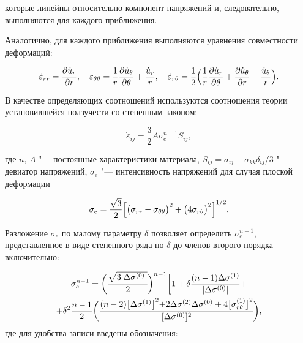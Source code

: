 которые линейны относительно компонент напряжений и, следовательно, выполняются для каждого приближения.



Аналогично, для каждого приближения выполняются уравнения совместности деформаций:

\begin{equation}

\label{mos:eq7}

\dot{\varepsilon}_{rr}=\frac{\partial \dot{u}_{r}}{\partial r} ,

\quad 

\dot{\varepsilon}_{\theta \theta}=\frac{1}{r}\frac{\partial \dot{u}_{\theta}}{\partial \theta}+\frac{\dot{u}_{r}}{r} ,

\quad

\dot{\varepsilon}_{r \theta}=\frac{1}{2}\Bigl(\frac{1}{r}\frac{\partial \dot{u}_{r}}{\partial \theta}+\frac{\partial \dot{u}_{\theta}}{\partial r}-\frac{\dot{u}_{\theta}}{r}\Bigr).

\end{equation}



В качестве определяющих соотношений используются соотношения теории установившейся ползучести со степенным законом:

\begin{equation}

\label{mos:eq8}

\dot{\varepsilon}_{ij}=\frac{3}{2}A\sigma_e^{n-1}S_{ij},

\end{equation}

где $n$, $A$ "--- постоянные характеристики материала, $S_{ij}=\sigma_{ij}- \sigma_{kk}\delta_{ij}/3$ "--- девиатор напряжений, $\sigma_e$ "--- интенсивность напряжений для случая плоской деформации

$$\sigma_e=\frac{\sqrt{3}}{2}\Bigl[\bigl(\sigma_{rr}-\sigma_{\theta\theta}\bigr)^2

+\bigl(4\sigma_{r\theta}\bigr)^2\Bigl]^{{1}/{2}}.$$

Разложение $\sigma_e$ по малому параметру $\delta$ позволяет определить  $\sigma_e^{n-1}$, представленное в виде степенного ряда по $\delta$ до членов второго порядка включительно:

\begin{multline}

\label{mos:eq9}

\sigma_e^{n-1}=\biggl{(}\cfrac{\sqrt{3|\Delta\sigma^{(0)}|}}{2}\biggl{)}^{n-1}

\biggl[1+\delta\frac{(n-1)\Delta\sigma^{(1)}}{|\Delta\sigma^{(0)}|}+\\

+\delta^2\frac{n-1}{2}\biggl{(}\cfrac{(n-2){\bigl[\Delta\sigma^{(1)}}\bigl]^2+

2\Delta\sigma^{(2)}\Delta\sigma^{(0)}+4{\bigl[\sigma_{r\theta}^{(1)}}\bigl]^2}{[\Delta\sigma^{(0)}]^2}\biggl{)},

\end{multline} где для удобства записи введены обозначения:

